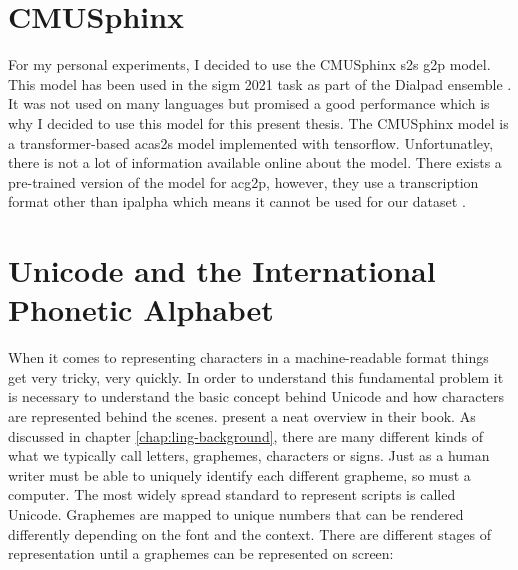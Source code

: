 \section{CMUSphinx}
\label{sec:cmu}
For my personal experiments, I decided to use the CMUSphinx \ac{s2s} \ac{g2p} model. This model has been used in the \ac{sigm} 2021 task as part of the Dialpad ensemble \citep{gautam.2021}. It was not used on many languages but promised a good performance which is why I decided to use this model for this present thesis. The CMUSphinx model is a transformer-based ac{as2s} model implemented with tensorflow. Unfortunatley, there is not a lot of information available online about the model. There exists a pre-trained version of the model for ac{g2p}, however, they use a transcription format other than \ac{ipalpha} which means it cannot be used for our dataset \citep{GitHub.03.02.2022}. 

\section{Unicode and the International Phonetic Alphabet}
\label{sec:unicode_ipa}
When it comes to representing characters in a machine-readable format things get very tricky, very quickly. In order to understand this fundamental problem it is necessary to understand the basic concept behind Unicode and how characters are represented behind the scenes. \citet{unicode-lingu} present a neat overview in their book. As discussed in chapter \ref{chap:ling-background}, there are many different kinds of what we typically call letters, graphemes, characters or signs. Just as a human writer must be able to uniquely identify each different grapheme, so must a computer. The most widely spread standard to represent scripts is called Unicode. Graphemes are mapped to unique numbers that can be rendered differently depending on the font and the context. There are different stages of representation until a graphemes can be represented on screen:


